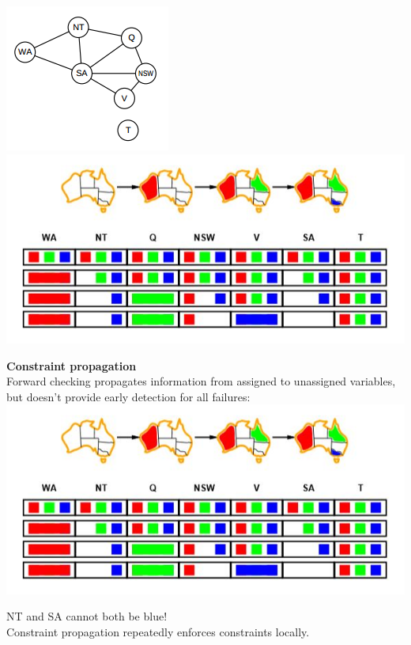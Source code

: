\includegraphics[scale=1]{chap1_pics/australiamap.png}\\
\includegraphics[scale=1]{chap1_pics/backtrack4.jpeg}

\textbf{Constraint propagation}\\
Forward checking propagates information from assigned to unassigned variables, but doesn’t provide early detection for all failures: \\
\includegraphics[scale=1]{chap1_pics/backtrack4.jpeg}

NT and SA cannot both be blue!\\
Constraint propagation repeatedly enforces constraints locally.\\

